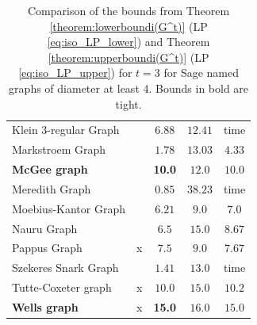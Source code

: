 \documentclass[a4paper,11pt]{article}
\theoremstyle{definition}
\begin{document}
\begin{table}[H]
\begin{tabular}{l|c|cc|c}
    Klein 3-regular Graph &  & $6.88$ & $12.41$ & time \\
    Markstroem Graph &  & $1.78$ & $13.03$ & $4.33$ \\
    \textbf{McGee graph} &  & \textbf{10.0} & $12.0$ & $10.0$ \\
    Meredith Graph &  & $0.85$ & $38.23$ & time \\
    Moebius-Kantor Graph &  & $6.21$ & $9.0$ & $7.0$ \\
    Nauru Graph &  & $6.5$ & $15.0$ & $8.67$ \\
    Pappus Graph & x & $7.5$ & $9.0$ & $7.67$ \\
    Szekeres Snark Graph &  & $1.41$ & $13.0$ & time \\
    Tutte-Coxeter graph & x & $10.0$ & $15.0$ & $10.2$ \\
    \textbf{Wells graph} & x & \textbf{15.0} & $16.0$ & $15.0$ \\
    \end{tabular}
    \caption{Comparison of the bounds from Theorem \ref{theorem:lowerboundi(G^t)} (LP \eqref{eq:iso_LP_lower}) and Theorem \ref{theorem:upperboundi(G^t)} (LP \eqref{eq:iso_LP_upper}) for $t=3$ for Sage named graphs of diameter at least 4. Bounds in bold are tight.}
    \label{tab:t3_sim}
\end{table}
\end{document}
